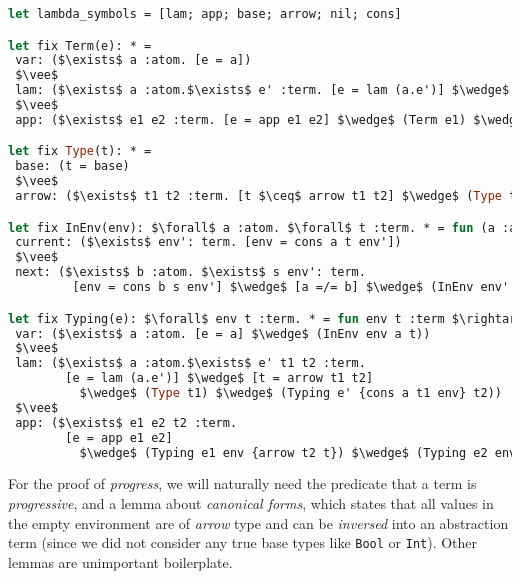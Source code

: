 \documentclass[english, mgr]{iithesis}
\begin{document}
\begin{lstlisting}[mathescape,language=OCaml]
let lambda_symbols = [lam; app; base; arrow; nil; cons]

let fix Term(e): * =
 var: ($\exists$ a :atom. [e = a])
 $\vee$
 lam: ($\exists$ a :atom.$\exists$ e' :term. [e = lam (a.e')] $\wedge$ (Term e'))
 $\vee$
 app: ($\exists$ e1 e2 :term. [e = app e1 e2] $\wedge$ (Term e1) $\wedge$ (Term e2))

let fix Type(t): * =
 base: (t = base)
 $\vee$
 arrow: ($\exists$ t1 t2 :term. [t $\ceq$ arrow t1 t2] $\wedge$ (Type t1) $\wedge$ (Type t2))

let fix InEnv(env): $\forall$ a :atom. $\forall$ t :term. * = fun (a :atom) (t :term) $\rightarrow$
 current: ($\exists$ env': term. [env = cons a t env'])
 $\vee$
 next: ($\exists$ b :atom. $\exists$ s env': term.
         [env = cons b s env'] $\wedge$ [a =/= b] $\wedge$ (InEnv env' a t))

let fix Typing(e): $\forall$ env t :term. * = fun env t :term $\rightarrow$
 var: ($\exists$ a :atom. [e = a] $\wedge$ (InEnv env a t))
 $\vee$
 lam: ($\exists$ a :atom.$\exists$ e' t1 t2 :term.
        [e = lam (a.e')] $\wedge$ [t = arrow t1 t2]
          $\wedge$ (Type t1) $\wedge$ (Typing e' {cons a t1 env} t2))
 $\vee$
 app: ($\exists$ e1 e2 t2 :term.
        [e = app e1 e2]
          $\wedge$ (Typing e1 env {arrow t2 t}) $\wedge$ (Typing e2 env t2))
\end{lstlisting}
For the proof of \textit{progress}, we will naturally need the predicate
that a term is \textit{progressive}, and a lemma about \textit{canonical forms},
which states that all values in the empty environment
are of \textit{arrow} type and can be \textit{inversed} into an abstraction term
(since we did not consider any true base types like \texttt{Bool} or \texttt{Int}).
Other lemmas are unimportant boilerplate.
\end{document}
